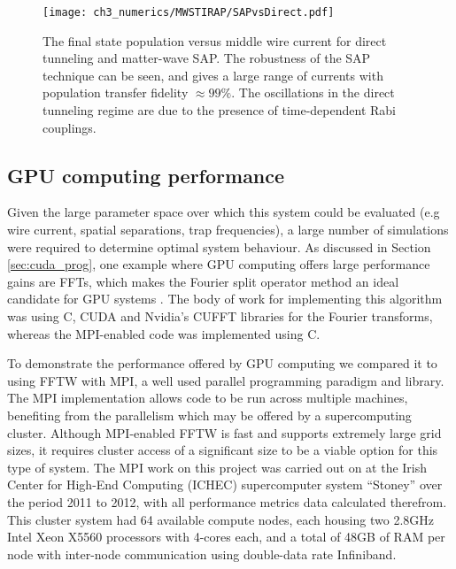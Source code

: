 \begin{figure}[tb]
    \centering
  \texttt{[image: ch3\_numerics/MWSTIRAP/SAPvsDirect.pdf]}
  \caption{The final state population versus middle wire current for direct tunneling and matter-wave SAP. The robustness of the SAP technique can be seen, and gives a large range of currents with population transfer fidelity $\approx 99 \%$. The oscillations in the direct tunneling regime are due to the presence of time-dependent Rabi couplings.}
  \label{fig:DIRVSMWSTIRAP}
\end{figure}


\subsection{GPU computing performance}
Given the large parameter space over which this system could be evaluated (e.g wire current, spatial separations, trap frequencies), a large number of simulations were required to determine optimal system behaviour. As discussed in Section \ref{sec:cuda_prog}, one example where GPU computing offers large performance gains are FFTs, which makes the Fourier split operator method an ideal candidate for GPU systems \cite{Num:Bauke_cpc_2011}. The body of work for implementing this algorithm was using C, CUDA and Nvidia's CUFFT libraries for the Fourier transforms, whereas the MPI-enabled code was implemented using C.

To demonstrate the performance offered by GPU computing we compared it to using FFTW with MPI, a well used parallel programming paradigm and library. The MPI implementation allows code to be run across multiple machines, benefiting from the parallelism which may be offered by a supercomputing cluster. Although MPI-enabled FFTW is fast and supports extremely large grid sizes, it requires cluster access of a significant size to be a viable option for this type of system. The MPI work on this project was carried out on at the Irish Center for High-End Computing (ICHEC) supercomputer system ``Stoney'' \cite{Ichec_stoney} over the period 2011 to 2012, with all performance metrics data calculated therefrom. This cluster system had 64 available compute nodes, each housing two 2.8GHz Intel Xeon X5560 processors with 4-cores each, and a total of 48GB of RAM per node with inter-node communication using double-data rate Infiniband.

